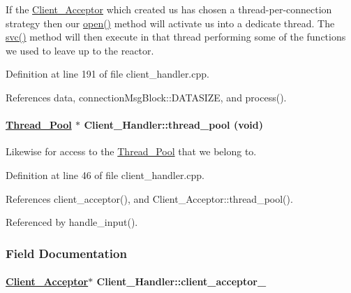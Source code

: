 If the \hyperlink{classClient__Acceptor}{Client\_\-Acceptor} which created us has chosen a thread-per-connection strategy then our \hyperlink{classClient__Handler_Client__Handlera2}{open()} method will activate us into a dedicate thread. The \hyperlink{classClient__Handler_Client__Handlerb0}{svc()} method will then execute in that thread performing some of the functions we used to leave up to the reactor. 

Definition at line 191 of file client\_\-handler.cpp.

References data, connection\-Msg\-Block::DATASIZE, and process().\hypertarget{classClient__Handler_Client__Handlerb6}{
\paragraph[thread\_\-pool]{\setlength{\rightskip}{0pt plus 5cm}\hyperlink{classThread__Pool}{Thread\_\-Pool} $\ast$ Client\_\-Handler::thread\_\-pool (void)}\hfill}
\label{classClient__Handler_Client__Handlerb6}


Likewise for access to the \hyperlink{classThread__Pool}{Thread\_\-Pool} that we belong to. 

Definition at line 46 of file client\_\-handler.cpp.

References client\_\-acceptor(), and Client\_\-Acceptor::thread\_\-pool().

Referenced by handle\_\-input().

\subsubsection{Field Documentation}
\hypertarget{classClient__Handler_Client__Handlern4}{
\paragraph[client\_\-acceptor\_\-]{\setlength{\rightskip}{0pt plus 5cm}\hyperlink{classClient__Acceptor}{Client\_\-Acceptor}$\ast$ Client\_\-Handler::client\_\-acceptor\_\-}\hfill}
\label{classClient__Handler_Client__Handlern4}




